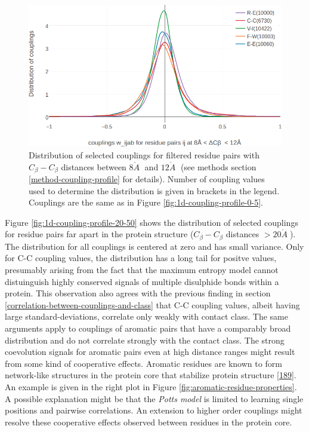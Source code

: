 \documentclass[11pt,a4paper,twoside]{book}
\newcommand{\Cb}{C_\beta}
\newcommand{\angstrom}{\mathring{A} \;}
\theoremstyle{definition}
\theoremstyle{definition}
\theoremstyle{remark}
\begin{document}
\begin{figure}
\includegraphics[width=1\linewidth]{img/coupling_matrix_analysis/1d_coupling_profile_8_12} \caption{Distribution of selected
couplings for filtered residue pairs with \(\Cb-\Cb\) distances between
\(8\angstrom\) and \(12 \angstrom\) (see methods section
\ref{method-coupling-profile} for details). Number of coupling values
used to determine the distribution is given in brackets in the legend.
Couplings are the same as in Figure \ref{fig:1d-coupling-profile-0-5}.}\label{fig:1d-coupling-profile-8-12}
\end{figure}

Figure \ref{fig:1d-coupling-profile-20-50} shows the distribution of
selected couplings for residue pairs far apart in the protein structure
(\(\Cb-\Cb\) distances \(> 20\angstrom\)).\\
The distribution for all couplings is centered at zero and has small
variance. Only for C-C coupling values, the distribution has a long tail
for positve values, presumably arising from the fact that the maximum
entropy model cannot distuinguish highly conserved signals of multiple
disulphide bonds within a protein. This observation also agrees with the
previous finding in section
\ref{correlation-between-couplings-and-class} that C-C coupling values,
albeit having large standard-deviations, correlate only weakly with
contact class. The same arguments apply to couplings of aromatic pairs
that have a comparably broad distribution and do not correlate strongly
with the contact class. The strong coevolution signals for aromatic
pairs even at high distance ranges might result from some kind of
cooperative effects. Aromatic residues are known to form network-like
structures in the protein core that stabilize protein structure
{[}\protect\hyperlink{ref-Burley1985}{189}{]}. An example is given in
the right plot in Figure \ref{fig:aromatic-residue-properties}. A
possible explanation might be that the \emph{Potts model} is limited to
learning single positions and pairwise correlations. An extension to
higher order couplings might resolve these cooperative effects observed
between residues in the protein core.
\end{document}
